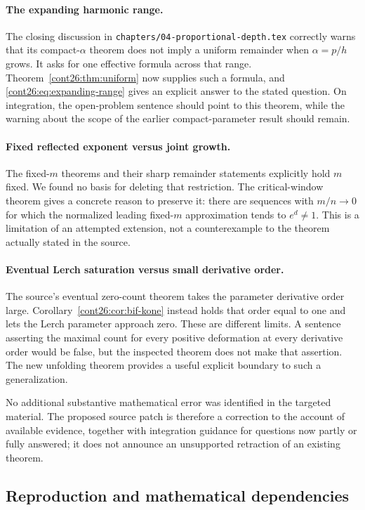 \documentclass[11pt,letterpaper]{article}
\numberwithin{equation}{section}
\theoremstyle{plain}
\theoremstyle{definition}
\theoremstyle{remark}
\newcommand{\src}[1]{\nolinkurl{#1}}
\begin{document}
\paragraph{The expanding harmonic range.}
The closing discussion in
\src{chapters/04-proportional-depth.tex} correctly warns that its
compact-$\alpha$ theorem does not imply a uniform remainder when
$\alpha=p/h$ grows. It asks for one effective formula across that
range. Theorem~\ref{cont26:thm:uniform} now supplies such a formula, and
\eqref{cont26:eq:expanding-range} gives an explicit answer to the stated
question. On integration, the open-problem sentence should point to
this theorem, while the warning about the scope of the earlier
compact-parameter result should remain.

\paragraph{Fixed reflected exponent versus joint growth.}
The fixed-$m$ theorems and their sharp remainder statements explicitly
hold $m$ fixed. We found no basis for deleting that restriction.
The critical-window theorem gives a concrete reason to preserve it:
there are sequences with $m/n\to0$ for which the normalized leading
fixed-$m$ approximation tends to $e^d\ne1$.
This is a limitation of an attempted extension, not a counterexample
to the theorem actually stated in the source.

\paragraph{Eventual Lerch saturation versus small derivative order.}
The source's eventual zero-count theorem takes the parameter
derivative order large. Corollary~\ref{cont26:cor:bif-kone} instead holds
that order equal to one and lets the Lerch parameter approach zero.
These are different limits. A sentence asserting the maximal count
for every positive deformation at every derivative order would be
false, but the inspected theorem does not make that assertion.
The new unfolding theorem provides a useful explicit boundary to
such a generalization.

No additional substantive mathematical error was identified in the
targeted material. The proposed source patch is therefore a correction
to the account of available evidence, together with integration
guidance for questions now partly or fully answered; it does not
announce an unsupported retraction of an existing theorem.

\subsection{Reproduction and mathematical dependencies}
\end{document}
